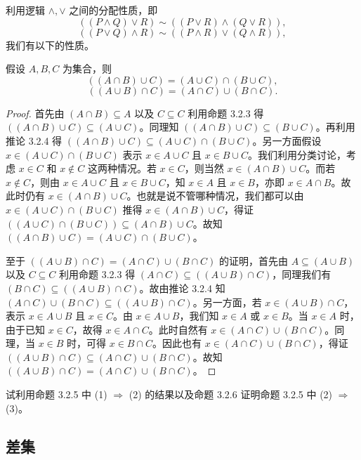 利用逻辑 $\wedge, \vee$ 之间的分配性质，即
$$ ((P \wedge Q) \vee R) \sim ((P \vee R) \wedge (Q \vee R)), $$
$$ ((P \vee Q) \wedge R) \sim ((P \wedge R) \vee (Q \wedge R)), $$
我们有以下的性质。

\begin{proposition}
假设 $A, B, C$ 为集合，则
$$ ((A \cap B) \cup C) = (A \cup C) \cap (B \cup C), $$
$$ ((A \cup B) \cap C) = (A \cap C) \cup (B \cap C). $$
\end{proposition}

\begin{proof}
首先由 $(A \cap B) \subseteq A$ 以及 $C \subseteq C$ 利用命题 3.2.3 得 $((A \cap B) \cup C) \subseteq (A \cup C)$。同理知 $((A \cap B) \cup C) \subseteq (B \cup C)$。再利用推论 3.2.4 得 $((A \cap B) \cup C) \subseteq (A \cup C) \cap (B \cup C)$。另一方面假设 $x \in (A \cup C) \cap (B \cup C)$ 表示 $x \in A \cup C$ 且 $x \in B \cup C$。我们利用分类讨论，考虑 $x \in C$ 和 $x \notin C$ 这两种情况。若 $x \in C$，则当然 $x \in (A \cap B) \cup C$。而若 $x \notin C$，则由 $x \in A \cup C$ 且 $x \in B \cup C$，知 $x \in A$ 且 $x \in B$，亦即 $x \in A \cap B$。故此时仍有 $x \in (A \cap B) \cup C$。也就是说不管哪种情况，我们都可以由 $x \in (A \cup C) \cap (B \cup C)$ 推得 $x \in (A \cap B) \cup C$，得证 $((A \cup C) \cap (B \cup C)) \subseteq (A \cap B) \cup C$。故知 $((A \cap B) \cup C) = (A \cup C) \cap (B \cup C)$。

至于 $((A \cup B) \cap C) = (A \cap C) \cup (B \cap C)$ 的证明，首先由 $A \subseteq (A \cup B)$ 以及 $C \subseteq C$ 利用命题 3.2.3 得 $(A \cap C) \subseteq ((A \cup B) \cap C)$，同理我们有 $(B \cap C) \subseteq ((A \cup B) \cap C)$。故由推论 3.2.4 知 $(A \cap C) \cup (B \cap C) \subseteq ((A \cup B) \cap C)$。另一方面，若 $x \in (A \cup B) \cap C$，表示 $x \in A \cup B$ 且 $x \in C$。由 $x \in A \cup B$，我们知 $x \in A$ 或 $x \in B$。当 $x \in A$ 时，由于已知 $x \in C$，故得 $x \in A \cap C$。此时自然有 $x \in (A \cap C) \cup (B \cap C)$。同理，当 $x \in B$ 时，可得 $x \in B \cap C$。因此也有 $x \in (A \cap C) \cup (B \cap C)$，得证 $((A \cup B) \cap C) \subseteq (A \cap C) \cup (B \cap C)$。故知 $((A \cup B) \cap C) = (A \cap C) \cup (B \cap C)$。
\end{proof}

\begin{question}
试利用命题 3.2.5 中 (1) $\Rightarrow$ (2) 的结果以及命题 3.2.6 证明命题 3.2.5 中 (2) $\Rightarrow$ (3)。
\end{question}

\subsection{差集}

